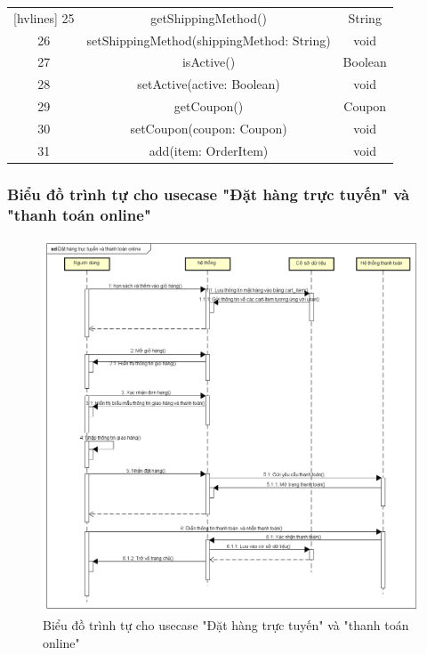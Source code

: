 \documentclass[../DoAn.tex]{subfiles}
\begin{document}
\begin{enumerate}
\begin{NiceTabular}{|c|c|c|}[hvlines]
25 & getShippingMethod()                 & String      \\
26 & setShippingMethod(shippingMethod: String) & void \\
27 & isActive()                          & Boolean     \\
28 & setActive(active: Boolean)          & void        \\
29 & getCoupon()                         & Coupon      \\
30 & setCoupon(coupon: Coupon)           & void        \\
31 & add(item: OrderItem)                & void        \\
\end{NiceTabular}
\end{enumerate}



\subsubsection{Biểu đồ trình tự cho usecase "Đặt hàng trực tuyến" và "thanh toán online"}
\begin{figure}[H]
    \centering
        \includegraphics[width=1\textwidth]{Hinhve/Đặt hàng trục tuyến và thanh toán online.png}
    \caption{Biểu đồ trình tự cho usecase "Đặt hàng trực tuyến" và "thanh toán online"}
    \label{fig:Fig10}
\end{figure}
\end{document}
